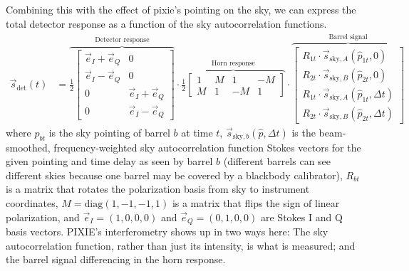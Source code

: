 \documentclass{article}
\begin{document}
Combining this with the effect of pixie's pointing on the sky,
we can express the total detector response as a function of the
sky autocorrelation functions.
\begin{align}
\vec s_\textrm{det}(t) &= \overbrace{\frac12\begin{bmatrix}
	\vec e_I+\vec e_Q & 0 \\
	\vec e_I-\vec e_Q & 0 \\
	0 & \vec e_I+\vec e_Q  \\
	0 & \vec e_I-\vec e_Q \end{bmatrix}}^\textrm{Detector response}
	\cdot
	\overbrace{\frac12\begin{bmatrix}
	1 &  M &  1 & -M \\
	M &  1 & -M &  1
	\end{bmatrix}}^\textrm{Horn response}
	\cdot
	\overbrace{\begin{bmatrix}
	R_{1t}\cdot\vec s_{\textrm{sky},A}(\hat p_{1t},0) \\
	R_{2t}\cdot\vec s_{\textrm{sky},B}(\hat p_{2t},0) \\
	R_{1t}\cdot\vec s_{\textrm{sky},A}(\hat p_{1t},\Delta t) \\
	R_{2t}\cdot\vec s_{\textrm{sky},B}(\hat p_{2t},\Delta t)
	\end{bmatrix}}^\textrm{Barrel signal}
	\label{eq:response}
\end{align}
where $\hat p_{bt}$ is the sky pointing of barrel $b$ at time $t$,
$\vec s_{\textrm{sky},b}(\hat p,\Delta t)$ is the beam-smoothed,
frequency-weighted sky autocorrelation
function Stokes vectors for the given pointing and time delay as
seen by barrel $b$
(different barrels can see different skies because one barrel may
be covered by a blackbody calibrator),
$R_{bt}$ is
a matrix that rotates the polarization basis from sky to instrument
coordinates, $M = \textrm{diag}(1,-1,-1,1)$ is a matrix that flips
the sign of linear polarization,
and $\vec e_I = (1,0,0,0)$ and $\vec e_Q = (0,1,0,0)$ are Stokes
I and Q basis vectors. PIXIE's interferometry shows up in two ways here:
The sky autocorrelation function, rather than just its intensity,
is what is measured; and the barrel signal differencing in the horn
response.
\end{document}
